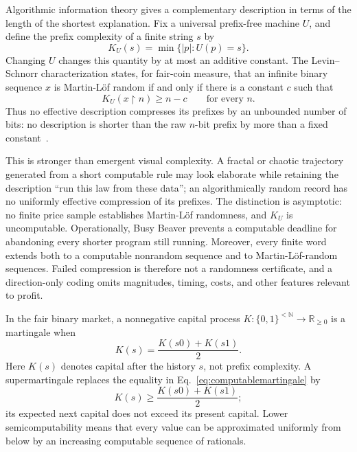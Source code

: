 \documentclass[aps,pra,reprint,superscriptaddress,amsmath,amssymb,floatfix]{revtex4-2}
\theoremstyle{plain}
\theoremstyle{definition}
\theoremstyle{remark}
\begin{document}
Algorithmic information theory gives a complementary description in terms of
the length of the shortest explanation. Fix a universal prefix-free machine
\(U\), and define the prefix complexity of a finite string \(s\) by
\begin{equation}
  K_U(s)=\min\{|p|:U(p)=s\}.
  \label{eq:prefixcomplexity}
\end{equation}
Changing \(U\) changes this quantity by at most an additive constant. The
Levin--Schnorr characterization states, for fair-coin measure, that an infinite
binary sequence \(x\) is Martin-L\"of random if and only if there is a constant
\(c\) such that
\begin{equation}
  K_U(x{\upharpoonright}n)\geq n-c
  \qquad\text{for every }n.
  \label{eq:levinschnorr}
\end{equation}
Thus no effective description compresses its prefixes by an unbounded number
of bits: no description is shorter than the raw \(n\)-bit prefix by more than
a fixed constant~\cite{Chaitin-1974,calude:02,Nies2009}.

This is stronger than emergent visual complexity. A fractal or chaotic
trajectory generated from a short computable rule may look elaborate while
retaining the description ``run this law from these data''; an algorithmically
random record has no uniformly effective compression of its prefixes. The
distinction is asymptotic: no finite price sample establishes Martin-L\"of
randomness, and \(K_U\) is uncomputable. Operationally, Busy Beaver prevents a
computable deadline for abandoning every shorter program still running.
Moreover, every finite word extends both to a computable nonrandom sequence and
to Martin-L\"of-random sequences. Failed compression is therefore not a
randomness certificate, and a direction-only coding omits magnitudes, timing,
costs, and other features relevant to profit.

In the fair binary market, a nonnegative capital process
\(K\colon\{0,1\}^{<\mathbb{N}}\to\mathbb{R}_{\geq0}\) is a martingale when
\begin{equation}
  K(s)=\frac{K(s0)+K(s1)}2.
  \label{eq:computablemartingale}
\end{equation}
Here \(K(s)\) denotes capital after the history \(s\), not prefix complexity.
A supermartingale replaces the equality in
Eq.~\eqref{eq:computablemartingale} by
\[
  K(s)\geq\frac{K(s0)+K(s1)}2;
\]
its expected next capital does not exceed its present capital. Lower
semicomputability means that every value can be approximated uniformly from
below by an increasing computable sequence of rationals.
\end{document}
